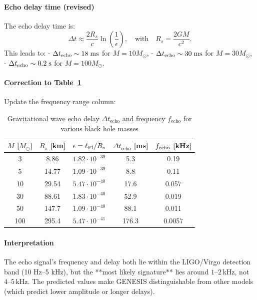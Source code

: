 \documentclass{article}
\begin{document}
\paragraph{Echo delay time (revised)}

The echo delay time is:
\[
  \Delta t \approx \frac{2R_s}{c} \ln\!\left(\frac{1}{\epsilon}\right),
\quad \text{with}\quad R_s = \frac{2GM}{c^2}.
\]
This leads to:
- \( \Delta t_{\rm echo} \sim 18\;\mathrm{ms} \) for \(M=10M_\odot\),
- \( \Delta t_{\rm echo} \sim 30\;\mathrm{ms} \) for \(M=30M_\odot\),
- \( \Delta t_{\rm echo} \sim 0.2\;\mathrm{s} \) for \(M=100M_\odot\).

\paragraph{Correction to Table~\ref{tab:echo_delay}}

Update the frequency range column:

\begin{table}[h!]
\centering
\renewcommand{\arraystretch}{1.2}
\caption{Gravitational wave echo delay $\Delta t_{\text{echo}}$ and frequency $f_{\text{echo}}$ for various black hole masses}
\label{tab:echo_delay}
\begin{tabular}{c|c|c|c|c}
\textbf{$M$ [$M_\odot$]} & \textbf{$R_s$ [km]} & \textbf{$\epsilon = \ell_{\rm Pl}/R_s$} & \textbf{$\Delta t_{\text{echo}}$ [ms]} & \textbf{$f_{\rm echo}$ [kHz]} \\
\hline
3   & 8.86   & $1.82 \cdot 10^{-39}$ & 5.3   & 0.19 \\
5   & 14.77  & $1.09 \cdot 10^{-39}$ & 8.8   & 0.11 \\
10  & 29.54  & $5.47 \cdot 10^{-40}$ & 17.6  & 0.057 \\
30  & 88.61  & $1.83 \cdot 10^{-40}$ & 52.9  & 0.019 \\
50  & 147.7  & $1.09 \cdot 10^{-40}$ & 88.1  & 0.011 \\
100 & 295.4  & $5.47 \cdot 10^{-41}$ & 176.3 & 0.0057 \\
\end{tabular}
\end{table}


\paragraph{Interpretation}

The echo signal’s frequency and delay both lie within the LIGO/Virgo detection band (10 Hz–5 kHz), but the **most likely signature** lies around \(1\text{–}2\,\mathrm{kHz}\), not \(4\text{–}5\,\mathrm{kHz}\). The predicted values make GENESIS distinguishable from other models (which predict lower amplitude or longer delays).
\end{document}
